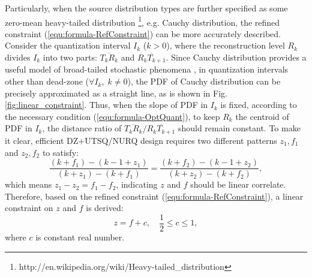 \documentclass[smallabstract,smallcaptions]{dccpaper}
\begin{document}
Particularly, when the source distribution types are further specified as some zero-mean heavy-tailed distribution \footnote{http://en.wikipedia.org/wiki/Heavy-tailed\_distribution}, e.g. Cauchy distribution, the refined constraint (\ref{equ:formula-RefConstraint}) can be more accurately described. Consider the quantization interval $I_k$ ($k > 0$), where the reconstruction level $R_k$ divides $I_k$ into two parts: $\overline{T_k R_k}$ and $\overline{R_k T_{k+1}}$. Since Cauchy distribution provides a useful model of broad-tailed stochastic phenomena \cite{Farvardin_TIT1984}, in quantization intervals other than dead-zone ($\forall I_k, \; k \ne 0$), the PDF of Cauchy distribution can be precisely approximated as a straight line, as is shown in Fig. \ref{fig:linear_constraint}. Thus, when the slope of PDF in $I_k$ is fixed, according to the necessary condition (\ref{equ:formula-OptQuant}), to keep $R_k$ the centroid of PDF in $I_k$, the distance ratio of $\overline{T_k R_k} / \overline{R_k T_{k+1}}$ should remain constant. To make it clear, efficient DZ+UTSQ/NURQ design requires two different patterns $z_1, f_1$ and $z_2, f_2$ to satisfy:
\begin{equation}\label{equ:formula-ratio}
\frac{(k+f_1)-(k-1+z_1)}{(k+z_1)-(k+f_1)} = \frac{(k+f_2)-(k-1+z_2)}{(k+z_2)-(k+f_2)},
\end{equation}
which means $z_1 - z_2 = f_1 - f_2$, indicating $z$ and $f$ should be linear correlate. Therefore, based on the refined constraint (\ref{equ:formula-RefConstraint}), a linear constraint on $z$ and $f$ is derived:
\begin{equation}\label{equ:formula-LinearConstraint}
	z = f+c, \quad \frac{1}{2} \le c \le 1, 
\end{equation}
where $c$ is constant real number.
\end{document}
